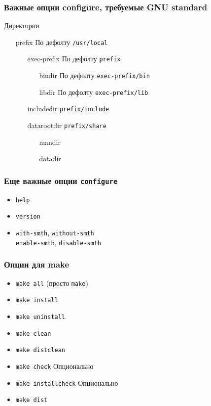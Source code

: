 \begin{frame}
 \frametitle{Важные опции configure, требуемые GNU standard}
   Директории
    \begin{enumerate}
     \item[prefix] По дефолту \texttt{/usr/local}
      \begin{enumerate}
         \item[exec-prefix] По дефолту \texttt{prefix}
         \begin{enumerate}
            \item[bindir] По дефолту \texttt{exec-prefix/bin}
            \item[libdir] По дефолту \texttt{exec-prefix/lib}
         \end{enumerate}
         \item[includedir] \texttt{prefix/include}
         \item[datarootdir] \texttt{prefix/share}
         \begin{enumerate}
            \item[mandir]
            \item[datadir]
         \end{enumerate}
      \end{enumerate}
    \end{enumerate}

\end{frame}

\begin{frame}
 \frametitle{Еще важные опции \texttt{configure}}
 \begin{itemize}
   \item \texttt{help}
   \item \texttt{version}
   \item \texttt{with-smth}, \texttt{without-smth} \\
		 \texttt{enable-smth}, \texttt{disable-smth}
  \end{itemize}
\end{frame}


\begin{frame}
  \frametitle{Опции для make}
  \begin{itemize}
    \item \texttt{make all} (просто \texttt{make})
    \item \texttt{make install}
    \item \texttt{make uninstall}
    \item \texttt{make clean}
    \item \texttt{make distclean}
    \item \texttt{make check} Опционально
    \item \texttt{make installcheck} Опционально
    \item \texttt{make dist}
  \end{itemize}
\end{frame}


